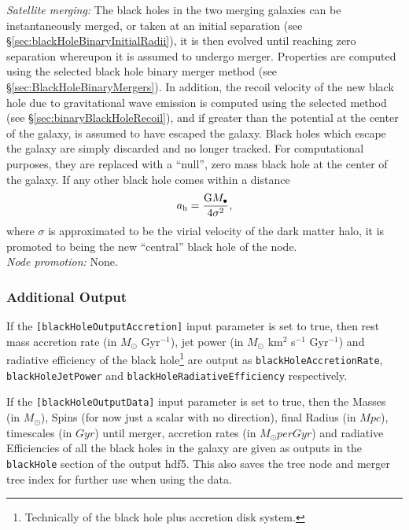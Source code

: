 \noindent\emph{Satellite merging:} The black holes in the two merging galaxies can be instantaneously merged, or taken at an initial separation (see \S\ref{sec:blackHoleBinaryInitialRadii}), it is then evolved until reaching zero separation whereupon it is assumed to undergo merger. Properties are computed using the selected black hole binary merger method (see \S\ref{sec:BlackHoleBinaryMergers}). In addition, the recoil velocity of the new black hole due to gravitational wave emission is computed using the selected method (see \S\ref{sec:binaryBlackHoleRecoil}), and if greater than the potential at the center of the galaxy, is assumed to have escaped the galaxy. Black holes which escape the galaxy are simply discarded and no longer tracked. For computational purposes, they are replaced with a ``null'', zero mass black hole at the center of the galaxy. If any other black hole comes within a distance 
\begin{equation}
a_{\rm h} = {{\rm G} M_\bullet \over 4 \sigma^2},
\end{equation}
where $\sigma$ is approximated to be the virial velocity of the dark matter halo, it is promoted to being the new ``central'' black hole of the node.\\

\noindent\emph{Node promotion:} None.\\

\subsubsection{Additional Output}

If the {\tt [blackHoleOutputAccretion]} input parameter is set to true, then rest mass accretion rate (in $M_\odot$ Gyr$^{-1}$), jet power (in $M_\odot$ km$^2$ s$^{-1}$ Gyr$^{-1}$) and radiative efficiency of the black hole\footnote{Technically of the black hole plus accretion disk system.} are output as {\tt blackHoleAccretionRate}, {\tt blackHoleJetPower} and {\tt blackHoleRadiativeEfficiency} respectively.

If the {\tt [blackHoleOutputData]} input parameter is set to true, then the Masses (in $M_\odot$), Spins (for now just a scalar with no direction), final Radius (in $Mpc$), timescales (in $Gyr$) until merger, accretion rates (in $M_\odot per Gyr$) and radiative Efficiencies of all the black holes in the galaxy are given as outputs in the {\tt blackHole} section of the output hdf5. This also saves the tree node and merger tree index for further use when using the data.

